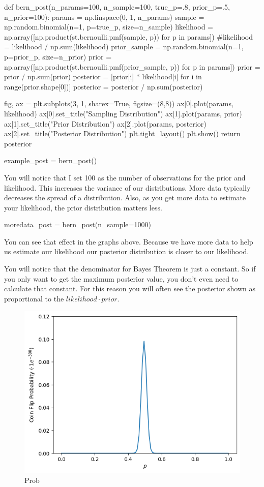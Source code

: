 \begin{ipython}
def bern_post(n_params=100, n_sample=100, true_p=.8, prior_p=.5, n_prior=100):
  params = np.linspace(0, 1, n_params)
  sample = np.random.binomial(n=1, p=true_p, size=n_sample)
  likelihood = np.array([np.product(st.bernoulli.pmf(sample, p)) for p in params])
  #likelihood = likelihood / np.sum(likelihood)
  prior_sample = np.random.binomial(n=1, p=prior_p, size=n_prior)
  prior = np.array([np.product(st.bernoulli.pmf(prior_sample, p)) for p in params])
  prior = prior / np.sum(prior)
  posterior = [prior[i] * likelihood[i] for i in range(prior.shape[0])]
  posterior = posterior / np.sum(posterior)

  fig, ax = plt.subplots(3, 1, sharex=True, figsize=(8,8))
  ax[0].plot(params, likelihood)
  ax[0].set_title("Sampling Distribution")
  ax[1].plot(params, prior)
  ax[1].set_title("Prior Distribution")
  ax[2].plot(params, posterior)
  ax[2].set_title("Posterior Distribution")
  plt.tight_layout()
  plt.show()
  return posterior

example_post = bern_post()
\end{ipython}

You will notice that I set 100 as the number of observations for the prior and likelihood. This increases the variance of our distributions. More data typically decreases the spread of a distribution. Also, as you get more data to estimate your likelihood, the prior distribution matters less.

\begin{ipython}
moredata_post = bern_post(n_sample=1000)
\end{ipython}

You can see that effect in the graphs above. Because we have more data to help us estimate our likelihood our posterior distribution is closer to our likelihood.

You will notice that the denominator for Bayes Theorem is just a constant. So if you only want to get the maximum posterior value, you don’t even need to calculate that constant. For this reason you will often see the posterior shown as proportional to the $likelihood \cdot prior$.

\begin{figure}[h]
  \begin{center}
    \includegraphics[width=0.6\linewidth]{figures/bayes_p1}
  \end{center}
  \caption{Prob}
  \label{fig:bayes_p1}
\end{figure}

